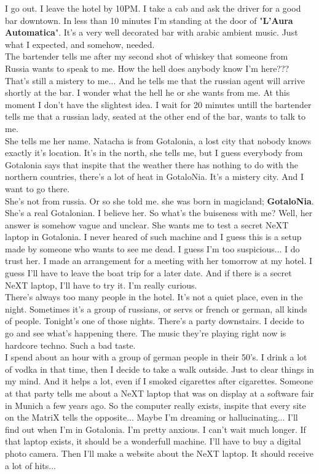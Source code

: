 \documentclass[11pt,twoside,a4paper]{book}
\begin{document}
\begin{multicols*}{2}
I go out. I leave the hotel by 10PM. I take a cab and ask the driver for a good bar downtown. In less than 10 minutes I'm standing at the door of "\textbf{L'Aura Automatica}". It's a very well decorated bar with arabic ambient music. Just what I expected, and somehow, needed. ~\\

The bartender tells me after my second shot of whiskey that someone from Russia wants to speak to me. How the hell does anybody know I'm here??? That's still a mistery to me... And he tells me that the russian agent will arrive shortly at the bar. I wonder what the hell he or she wants from me. At this moment I don't have the slightest idea. I wait for 20 minutes untill the bartender tells me that a russian lady, seated at the other end of the bar, wants to talk to me. ~\\

She tells me her name. Natacha is from Gotalonia, a lost city that nobody knows exactly it's location. It's in the north, she tells me, but I guess everybody from Gotalonia says that inspite that the weather there has nothing to do with the northern countries, there's a lot of heat in GotaloNia. It's a mistery city. And I want to go there. ~\\

She's not from russia. Or so she told me. she was born in magicland; \textbf{GotaloNia}. She's a real Gotalonian. I believe her. So what's the buiseness with me? Well, her answer is somehow vague and unclear. She wants me to test a secret NeXT laptop in Gotalonia. I never heared of such machine and I guess this is a setup made by someone who wants to see me dead. I guess I'm too suspicious... I do trust her. I made an arrangement for a meeting with her tomorrow at my hotel. I guess I'll have to leave the boat trip for a later date. And if there is a secret NeXT laptop, I'll have to try it. I'm really curious. ~\\

There's always too many people in the hotel. It's not a quiet place, even in the night. Sometimes it's a group of russians, or servs or french or german, all kinds of people. Tonight's one of those nights. There's a party downstairs. I decide to go and see what's happening there. The music they're playing right now is hardcore techno. Such a bad taste. ~\\

I spend about an hour with a group of german people in their 50's. I drink a lot of vodka in that time, then I decide to take a walk outside. Just to clear things in my mind. And it helps a lot, even if I smoked cigarettes after cigarettes. Someone at that party tells me about a NeXT laptop that was on display at a software fair in Munich a few years ago. So the computer really exists, inspite that every site on the MatriX tells the opposite... Maybe I'm dreaming or hallucinating... I'll find out when I'm in Gotalonia. I'm pretty anxious. I can't wait much longer. If that laptop exists, it should be a wonderfull machine. I'll have to buy a digital photo camera. Then I'll make a website about the NeXT laptop. It should receive a lot of hits... ~\\


\end{multicols*}
\end{document}
